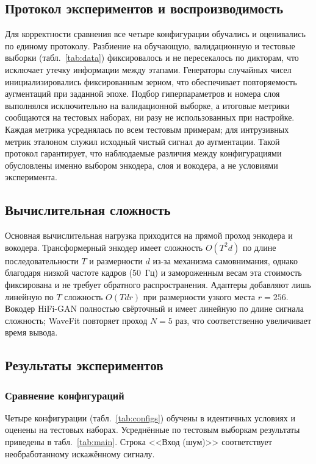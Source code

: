\subsection{Протокол экспериментов и воспроизводимость}

Для корректности сравнения все четыре конфигурации обучались и оценивались по
единому протоколу. Разбиение на обучающую, валидационную и тестовые выборки
(табл.~\ref{tab:data}) фиксировалось и не пересекалось по дикторам, что исключает
утечку информации между этапами. Генераторы случайных чисел инициализировались
фиксированным зерном, что обеспечивает повторяемость аугментаций при заданной
эпохе. Подбор гиперпараметров и номера слоя выполнялся исключительно на
валидационной выборке, а итоговые метрики сообщаются на тестовых наборах, ни разу
не использованных при настройке. Каждая метрика усреднялась по всем тестовым
примерам; для интрузивных метрик эталоном служил исходный чистый сигнал до
аугментации. Такой протокол гарантирует, что наблюдаемые различия между
конфигурациями обусловлены именно выбором энкодера, слоя и вокодера, а не
условиями эксперимента.

\subsection{Вычислительная сложность}

Основная вычислительная нагрузка приходится на прямой проход энкодера и вокодера.
Трансформерный энкодер имеет сложность $O(T^2 d)$ по длине последовательности
$T$ и размерности $d$ из-за механизма самовнимания, однако благодаря низкой
частоте кадров (50~Гц) и замороженным весам эта стоимость фиксирована и не
требует обратного распространения. Адаптеры добавляют лишь линейную по $T$
сложность $O(T d r)$ при размерности узкого места $r=256$. Вокодер HiFi-GAN
полностью свёрточный и имеет линейную по длине сигнала сложность; WaveFit
повторяет проход $N=5$ раз, что соответственно увеличивает время вывода.

\subsection{Результаты экспериментов}

\subsubsection{Сравнение конфигураций}

Четыре конфигурации (табл.~\ref{tab:configs}) обучены в идентичных условиях и
оценены на тестовых наборах. Усреднённые по тестовым выборкам результаты
приведены в табл.~\ref{tab:main}. Строка <<Вход (шум)>> соответствует
необработанному искажённому сигналу.


